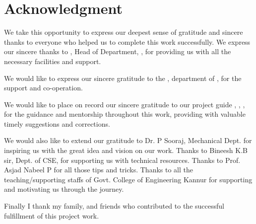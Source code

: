 \chapter*{Acknowledgment}%
%


\begin{spacing}{1.45}
	\par We take this opportunity to express our deepest sense of gratitude and sincere thanks to everyone who helped us to complete this work successfully. We express our sincere thanks to \hod, Head of Department, \dept, \college\hspace*{2pt} for providing  us with all the necessary facilities and support.\par
	
	We would like to express our sincere gratitude to the \projcordinatorA, department of \dept, \college \space for the support and co-operation.
	
	We would like to place on record our sincere gratitude to our project guide \guide, \guidedes, \dept, \college  %
	\space for the guidance and mentorship throughout this work, providing with valuable timely suggestions and corrections.
	
	We would also like to extend our gratitude to Dr. P Sooraj, Mechanical Dept. for inspiring us with the great idea and vision on our work. Thanks to Bineesh K.B sir, Dept. of CSE, for supporting us with technical resources. Thanks to Prof. Asjad Nabeel P for all those tips and tricks. Thanks to all the teaching/supporting staffs of Govt. College of Engineering Kannur for supporting and motivating us through the journey.
	
	Finally I thank my family, and friends who contributed to the successful fulfillment of this project work.
	
	\vfill
	\begin{flushright}
		\textbf{\studentA}\\
		\textbf{\studentB}\\
		\textbf{\studentC}\\
		\textbf{\studentD}\\
	\end{flushright}
\end{spacing}

\thispagestyle{plain}

